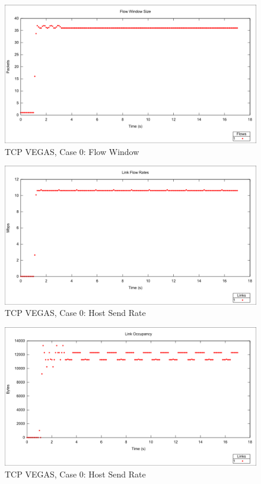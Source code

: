 \begin{figure}[htbp]
    \centering
    \includegraphics[width=\textwidth]{vegas0/Flow_Window.png}
    \caption{TCP VEGAS, Case 0: Flow Window}
\end{figure}


\begin{figure}[htbp]
    \centering
    \includegraphics[width=\textwidth]{vegas0/Link_Flow_Rate.png}
    \caption{TCP VEGAS, Case 0: Host Send Rate}
\end{figure}

\begin{figure}[htbp]
    \centering
    \includegraphics[width=\textwidth]{vegas0/Link_Occupancy.png}
    \caption{TCP VEGAS, Case 0: Host Send Rate}
\end{figure}

